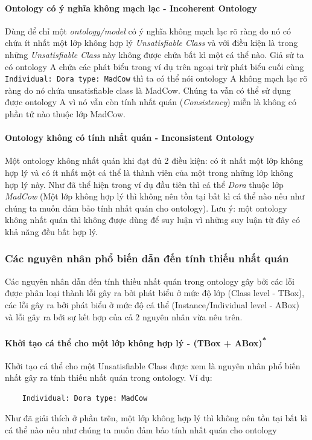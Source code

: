 \paragraph{Ontology có ý nghĩa không mạch lạc - Incoherent Ontology} Dùng để chỉ một \textit{ontology/model} có ý nghĩa không mạch lạc rõ ràng do nó có chứa ít nhất một lớp không hợp lý \textit{Unsatisfiable Class} và với điều kiện là trong những \textit{Unsatisfiable Class} này không được chứa bất kì một cá thể nào. Giả sử ta có ontology A chứa các phát biểu trong ví dụ trên ngoại trừ phát biểu cuối cùng \texttt{Individual: Dora type: MadCow} thì ta có thể nói ontology A không mạch lạc rõ ràng do nó chứa unsatisfiable class là MadCow. Chúng ta vẫn có thể sử dụng được ontology A vì nó vẫn còn tính nhất quán (\textit{Consistency}) miễn là không có phần tử nào thuộc lớp MadCow.
\paragraph{Ontology không có tính nhất quán - Inconsistent Ontology} Một ontology không nhất quán khi đạt đủ 2 điều kiện: có ít nhất một lớp không hợp lý và có ít nhất một cá thể là thành viên của một trong những lớp không hợp lý này. Như đã thể hiện trong ví dụ đầu tiên thì cá thể \textit{Dora} thuộc lớp \textit{MadCow} (Một lớp không hợp lý thì không nên tồn tại bất kì cá thể nào nếu như chúng ta muốn đảm bảo tính nhất quán cho ontology). Lưu ý: một ontology không nhất quán thì không được dùng để suy luận vì những suy luận từ đây có khả năng đều bất hợp lý.

\subsubsection{Các nguyên nhân phổ biến dẫn đến tính thiếu nhất quán}
Các nguyên nhân dẫn đến tính thiếu nhất quán trong ontology gây bởi các lỗi được phân loại thành lỗi gây ra bởi phát biểu ở mức độ lớp (Class level - TBox), các lỗi gây ra bởi phát biểu ở mức độ cá thể (Instance/Individual level - ABox)\cite{inconsitentReason} và lỗi gây ra bởi sự kết hợp của cả 2 nguyên nhân vừa nêu trên.
{
	\let\thefootnote\relax{}		
		\let\thefootnote\relax{}
}
\paragraph{Khởi tạo cá thể cho một lớp không hợp lý - (TBox + ABox)\textsuperscript{*}} Khởi tạo cá thể cho một Unsatisfiable Class được xem là nguyên nhân phổ biến nhất gây ra tính thiếu nhất quán trong ontology. Ví dụ:
\begin{verbatim}
	Individual: Dora type: MadCow
\end{verbatim}
Như đã giải thích ở phần trên, một lớp không hợp lý thì không nên tồn tại bất kì cá thể nào nếu như chúng ta muốn đảm bảo tính nhất quán cho ontology

